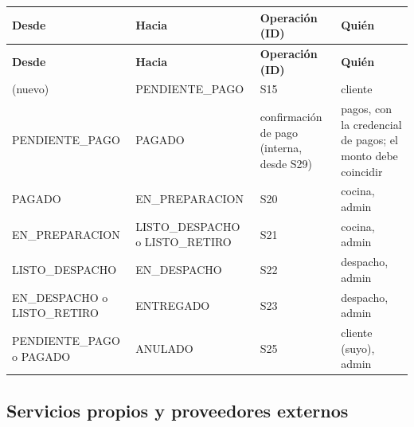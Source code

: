 {\small
\setlength{\tabcolsep}{3pt}\renewcommand{\arraystretch}{1.15}
\begin{longtable}{|>{\raggedright\arraybackslash}p{}|>{\raggedright\arraybackslash}p{}|>{\raggedright\arraybackslash}p{}|>{\raggedright\arraybackslash}p{}|}
\hline
\textbf{Desde} & \textbf{Hacia} & \textbf{Operación (ID)} & \textbf{Quién} \\ \hline
\endfirsthead
\hline
\textbf{Desde} & \textbf{Hacia} & \textbf{Operación (ID)} & \textbf{Quién} \\ \hline
\endhead
(nuevo) & PENDIENTE\_\allowbreak{}PAGO & S15 & cliente \\ \hline
PENDIENTE\_\allowbreak{}PAGO & PAGADO & confirmación de pago (interna, desde S29) & pagos, con la credencial de pagos; el monto debe coincidir \\ \hline
PAGADO & EN\_\allowbreak{}PREPARACION & S20 & cocina, admin \\ \hline
EN\_\allowbreak{}PREPARACION & LISTO\_\allowbreak{}DESPACHO o LISTO\_\allowbreak{}RETIRO & S21 & cocina, admin \\ \hline
LISTO\_\allowbreak{}DESPACHO & EN\_\allowbreak{}DESPACHO & S22 & despacho, admin \\ \hline
EN\_\allowbreak{}DESPACHO o LISTO\_\allowbreak{}RETIRO & ENTREGADO & S23 & despacho, admin \\ \hline
PENDIENTE\_\allowbreak{}PAGO o PAGADO & ANULADO & S25 & cliente (suyo), admin \\ \hline
\end{longtable}
}

\subsection{Servicios propios y proveedores externos}

